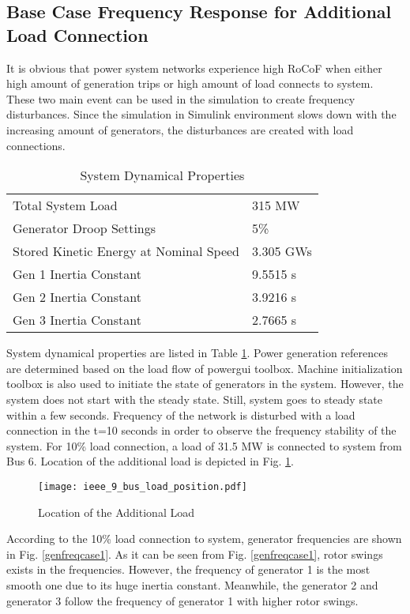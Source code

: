 \subsection{Base Case Frequency Response for Additional Load Connection}
It is obvious that power system networks experience high RoCoF when either high amount of generation trips or high amount of load connects to system. These two main event can be used in the simulation to create frequency disturbances. Since the simulation in Simulink environment slows down with the increasing amount of generators, the disturbances are created with load connections.\par
\begin{table}[h]
	\centering
	\begin{tabular}{ll}
		\hline
		Total System Load                      & 315 MW    \\
		Generator Droop Settings               & 5\%       \\
		Stored Kinetic Energy at Nominal Speed & 3.305 GWs \\
		Gen 1 Inertia Constant                 & 9.5515 s  \\
		Gen 2 Inertia Constant                 & 3.9216 s  \\
		Gen 3 Inertia Constant                 & 2.7665 s  \\ \hline
	\end{tabular}
	\caption{System Dynamical Properties}
	\label{systemdynamicaldata}
\end{table}
System dynamical properties are listed in Table \ref{systemdynamicaldata}. Power generation references are determined based on the load flow of powergui toolbox. Machine initialization toolbox is also used to initiate the state of generators in the system. However, the system does not start with the steady state. Still, system goes to steady state within a few seconds. Frequency of the network is disturbed with a load connection in the t=10 seconds in order to observe the frequency stability of the system. For 10\% load connection, a load of 31.5 MW is connected to system from Bus 6. Location of the additional load is depicted in Fig. \ref{ieee_9_bus_load}.\par
\begin{figure}[h]
	\centering
	\texttt{[image: ieee\_9\_bus\_load\_position.pdf]}
	\caption{Location of the Additional Load}
	\label{ieee_9_bus_load}
\end{figure}
According to the 10\% load connection to system, generator frequencies are shown in Fig. \ref{genfreqcase1}. As it can be seen from Fig. \ref{genfreqcase1}, rotor swings exists in the frequencies. However, the frequency of generator 1 is the most smooth one due to its huge inertia constant. Meanwhile, the generator 2 and generator 3 follow the frequency of generator 1 with higher rotor swings.\par
